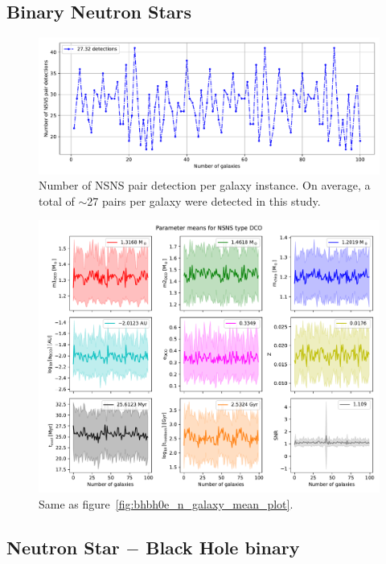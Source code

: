 \subsection{Binary Neutron Stars}
\begin{figure}[!h]
    \centering
    \includegraphics[width=\columnwidth]{analysis_data/004__images_for_latex/NSNS0e_n_detections}
    \caption{Number of NSNS pair detection per galaxy instance. On average, a total of $\sim$27 pairs per galaxy were detected in this study.}
    \label{fig:nsns0endetections}
\end{figure}

\begin{figure}[!h]
    \centering
    \includegraphics[width=\columnwidth]{analysis_data/004__images_for_latex/NSNS0e_n_galaxy_mean_plot}
    \caption{Same as figure~\ref{fig:bhbh0e_n_galaxy_mean_plot}.}
    \label{fig:nsns0e_n_galaxy_mean_plot}
\end{figure}

\newpage

\subsection{Neutron Star $-$ Black Hole binary}

